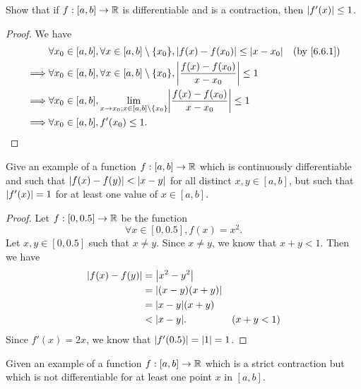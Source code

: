 \begin{ex}\label{ex:6.6.2}
  Show that if \(f : [a, b] \to \mathbb{R}\) is differentiable and is a contraction, then \(\left\lvert f'(x)\right\rvert \leq 1\).
\end{ex}

\begin{proof}
  We have
  \begin{align*}
             & \forall x_0 \in [a, b], \forall x \in [a, b] \setminus \{x_0\}, \abs{f(x) - f(x_0)} \leq \abs{x - x_0}               & \text{(by \cref{6.6.1})} \\
    \implies & \forall x_0 \in [a, b], \forall x \in [a, b] \setminus \{x_0\}, \abs{\frac{f(x) - f(x_0)}{x - x_0}} \leq 1                                      \\
    \implies & \forall x_0 \in [a, b], \lim_{x \to x_0 ; x \in [a, b] \setminus \{x_0\}} \abs{\frac{f(x) - f(x_0)}{x - x_0}} \leq 1                            \\
    \implies & \forall x_0 \in [a, b], f'(x_0) \leq 1.
  \end{align*}
\end{proof}

\begin{ex}\label{ex:6.6.3}
  Give an example of a function \(f : [a, b] \to \mathbb{R}\) which is continuously differentiable and such that \(\left\lvert f(x) - f(y)\right\rvert < \left\lvert x - y\right\rvert\) for all distinct \(x, y \in [a, b]\), but such that \(\left\lvert f'(x)\right\rvert = 1\) for at least one value of \(x \in [a, b]\).
\end{ex}

\begin{proof}
  Let \(f : [0, 0.5] \to \mathbb{R}\) be the function
  \[
    \forall x \in [0, 0.5], f(x) = x^2.
  \]
  Let \(x, y \in [0, 0.5]\) such that \(x \neq y\).
  Since \(x \neq y\), we know that \(x + y < 1\).
  Then we have
  \begin{align*}
    \abs{f(x) - f(y)} & = \abs{x^2 - y^2}                    \\
                      & = \abs{(x - y)(x + y)}               \\
                      & = \abs{x - y} (x + y)                \\
                      & < \abs{x - y}.         & (x + y < 1)
  \end{align*}
  Since \(f'(x) = 2x\), we know that \(\left\lvert f'(0.5)\right\rvert = \left\lvert1\right\rvert = 1\).
\end{proof}

\begin{ex}\label{ex:6.6.4}
  Given an example of a function \(f : [a, b] \to \mathbb{R}\) which is a strict contraction but which is not differentiable for at least one point \(x\) in \([a, b]\).
\end{ex}

